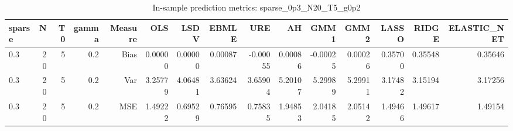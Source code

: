 \begin{table}[!htbp]\centering
\caption{In-sample prediction metrics: sparse_0p3_N20_T5_g0p2}
\label{tab:table2_sparse_0p3_N20_T5_g0p2}
\begin{tabular}{lrrrrrrrrrrrrrr}
\hline
sparse & N & T0 & gamma & Measure & OLS & LSDV & EBMLE & URE & AH & GMM1 & GMM2 & LASSO & RIDGE & ELASTIC_NET \\
\hline
0.3 & 20 & 5 & 0.2 & Bias & 0.00000 & 0.00000 & 0.00087 & -0.00055 & 0.00086 & -0.00025 & 0.00026 & 0.35700 & 0.35548 & 0.35646 \\
0.3 & 20 & 5 & 0.2 & Var & 3.25779 & 4.06481 & 3.63624 & 3.65904 & 5.20107 & 5.29989 & 5.29911 & 3.17482 & 3.15194 & 3.17256 \\
0.3 & 20 & 5 & 0.2 & MSE & 1.49222 & 0.69529 & 0.76595 & 0.75835 & 1.94853 & 2.04185 & 2.05142 & 1.49466 & 1.49617 & 1.49154 \\
\hline
\end{tabular}
\end{table}

